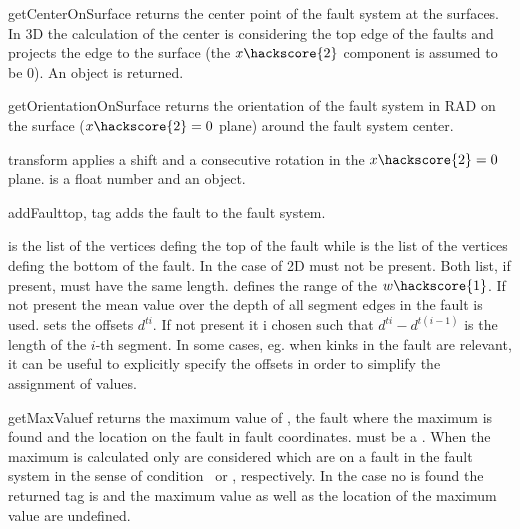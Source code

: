 \begin{methoddesc}[FaultSystem]{getCenterOnSurface}{}
returns the center point of the fault system at the surfaces. In 3D the calculation of the center is
considering the top edge of the faults and projects the edge to the surface (the $x\hackscore{2}$ component is assumed to be 0). An \numpyNDA object is returned.
\end{methoddesc}

\begin{methoddesc}[FaultSystem]{getOrientationOnSurface}{}
returns the orientation of the fault system in RAD on the surface ($x\hackscore{2}=0$ plane) around the fault system center.
\end{methoddesc}
\begin{methoddesc}[FaultSystem]{transform}{}
applies a shift  and a consecutive rotation in the $x\hackscore{2}=0$ plane.
 is a float number and  an \numpyNDA object.
\end{methoddesc}

\begin{methoddesc}[FaultSystem]{addFault}{top, tag }
adds the  fault  to the fault system. 

 is the list of the vertices defing the top of the fault
while  is the list of the vertices defing the bottom of the fault.
In the case of 2D  must not be present. Both list, if present, must have the same length.
 defines the range of the $w\hackscore{1}$. If not present the mean value over the depth of 
all segment edges in the fault is used.
 sets the offsets $d^{ti}$. If not present it i chosen such that $d^{ti}-d^{t(i-1)}$ is the length of the $i$-th segment. In some cases, eg. when kinks in the fault are relevant, it can be useful
to explicitly specify the offsets in order to simplify the assignment of values.
\end{methoddesc}

\begin{methoddesc}[FaultSystem]{getMaxValue}{f}
returns the maximum value of , the fault where the maximum is found and the location on the fault in fault coordinates.  must be a \Scalar. When the maximum is calculated only \DataSamplePoints are considered
which are on a fault in the fault system in the sense of condition~\label{eq:2D line 3} or \label{eq:3D line 3}, respectively. In the case no \DataSamplePoints is found the returned tag is  and
the maximum value as well as the location of the maximum value are undefined.
\end{methoddesc}

